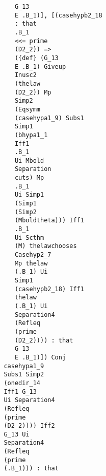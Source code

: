 \documentclass[12pt]{article}
\begin{document}
\begin{verbatim}
                                     G_13 
                                     E .B_1)], [(casehypb2_18 
                                     : that 
                                     .B_1 
                                     <<= prime 
                                     (D2_2)) => 
                                     ({def} (G_13 
                                     E .B_1) Giveup 
                                     Inusc2 
                                     (thelaw 
                                     (D2_2)) Mp 
                                     Simp2 
                                     (Eqsymm 
                                     (casehypa1_9) Subs1 
                                     Simp1 
                                     (bhypa1_1 
                                     Iff1 
                                     .B_1 
                                     Ui Mbold 
                                     Separation 
                                     cuts) Mp 
                                     .B_1 
                                     Ui Simp1 
                                     (Simp1 
                                     (Simp2 
                                     (Mboldtheta))) Iff1 
                                     .B_1 
                                     Ui Scthm 
                                     (M) thelawchooses 
                                     Casehyp2_7 
                                     Mp thelaw 
                                     (.B_1) Ui 
                                     Simp1 
                                     (casehypb2_18) Iff1 
                                     thelaw 
                                     (.B_1) Ui 
                                     Separation4 
                                     (Refleq 
                                     (prime 
                                     (D2_2)))) : that 
                                     G_13 
                                     E .B_1)]) Conj 
                                  casehypa1_9 
                                  Subs1 Simp2 
                                  (onedir_14 
                                  Iff1 G_13 
                                  Ui Separation4 
                                  (Refleq 
                                  (prime 
                                  (D2_2)))) Iff2 
                                  G_13 Ui 
                                  Separation4 
                                  (Refleq 
                                  (prime 
                                  (.B_1))) : that 

\end{verbatim}
\end{document}
